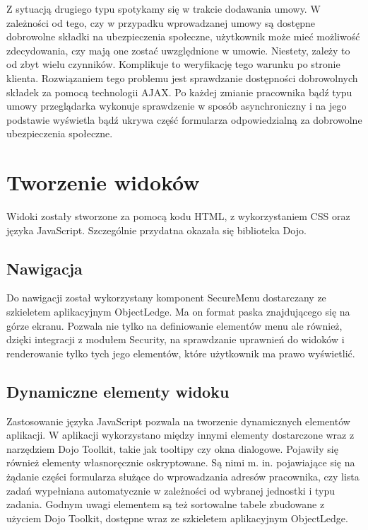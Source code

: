 Z sytuacją drugiego typu spotykamy się w trakcie dodawania umowy. W zależności od tego, czy w przypadku wprowadzanej umowy są dostępne dobrowolne składki na ubezpieczenia społeczne, użytkownik może mieć możliwość zdecydowania, czy mają one zostać uwzględnione w umowie. Niestety, zależy to od zbyt wielu czynników. Komplikuje to weryfikację tego warunku po stronie klienta. Rozwiązaniem tego problemu jest sprawdzanie dostępności dobrowolnych składek za pomocą technologii AJAX. Po każdej zmianie pracownika bądź typu umowy przeglądarka wykonuje sprawdzenie w sposób asynchroniczny i na jego podstawie wyświetla bądź ukrywa część formularza odpowiedzialną za dobrowolne ubezpieczenia społeczne.

\section[Tworzenie widoków][Tworzenie widoków]{Tworzenie widoków}
Widoki zostały stworzone za pomocą kodu HTML, z wykorzystaniem CSS oraz języka JavaScript. Szczególnie przydatna okazała się biblioteka Dojo.

\subsection[Nawigacja][Nawigacja]{Nawigacja}
Do nawigacji został wykorzystany komponent SecureMenu dostarczany ze szkieletem aplikacyjnym ObjectLedge. Ma on format paska znajdującego się na górze ekranu. Pozwala nie tylko na definiowanie elementów menu ale również, dzięki integracji z modułem Security, na sprawdzanie uprawnień do widoków i renderowanie tylko tych jego elementów, które użytkownik ma prawo wyświetlić.

\subsection[Dynamiczne elementy widoku][Dynamiczne elementy widoku]{Dynamiczne elementy widoku}
Zastosowanie języka JavaScript pozwala na tworzenie dynamicznych elementów aplikacji. W aplikacji wykorzystano między innymi elementy dostarczone wraz z narzędziem Dojo Toolkit, takie jak tooltipy czy okna dialogowe. Pojawiły się również elementy własnoręcznie oskryptowane. Są nimi m. in. pojawiające się na żądanie części formularza służące do wprowadzania adresów pracownika, czy lista zadań wypełniana automatycznie w zależności od wybranej jednostki i typu zadania. Godnym uwagi elementem są też sortowalne tabele zbudowane z użyciem Dojo Toolkit, dostępne wraz ze szkieletem aplikacyjnym ObjectLedge.

